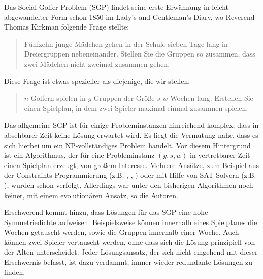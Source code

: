 Das Social Golfer Problem (SGP) findet seine erste Erwähnung in leicht abgewandelter Form schon 1850 im Lady's and Gentleman's Diary, wo Reverend Thomas Kirkman folgende Frage stellte:

\begin{quote}
Fünfzehn junge Mädchen gehen in der Schule sieben Tage lang in Dreiergruppen nebeneinander. Stellen Sie die Gruppen so zusammen, dass zwei Mädchen nicht zweimal zusammen gehen.
\end{quote}
Diese Frage ist etwas spezieller als diejenige, die wir stellen:
\begin{quote}
$n$ Golfern spielen in $g$ Gruppen der Größe $s$ $w$ Wochen lang. Erstellen Sie einen Spielplan, in dem zwei Spieler maximal einmal zusammen spielen.
\end{quote}

Das allgemeine SGP ist für einige Probleminstanzen hinreichend komplex, dass in absehbarer Zeit keine Lösung erwartet wird. Es liegt die Vermutung nahe, dass es sich hierbei um ein NP-vollständiges Problem handelt.
Vor diesem Hintergrund ist ein Algorithmus, der für eine Probleminstanz $(g,s,w)$ in vertretbarer Zeit einen Spielplan erzeugt, von großem Interesse.
Mehrere Ansätze, zum Beispiel aus der Constraints Programmierung (z.B. \cite{fahle01}, \cite{smith01}, \cite{sellmann02}) oder mit Hilfe von SAT Solvern (z.B. \cite{triska08}), wurden schon verfolgt. Allerdings war unter den bisherigen Algorithmen noch keiner, mit einem evolutionären Ansatz, so die Autoren. 

Erschwerend kommt hinzu, dass Lösungen für das SGP eine hohe Symmetriedichte aufweisen. Beispielsweise können innerhalb eines Spielplanes die Wochen getauscht werden, sowie die Gruppen innerhalb einer Woche. Auch können zwei Spieler vertauscht werden, ohne dass sich die Lösung prinzipiell von der Alten unterscheidet. Jeder Lösungsansatz, der sich nicht eingehend mit dieser Erschwernis befasst, ist dazu verdammt, immer wieder redundante Lösungen zu finden.
